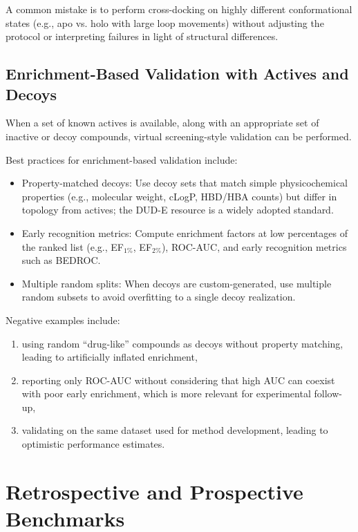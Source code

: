\documentclass[12pt,a4paper]{article}
\begin{document}
A common mistake is to perform cross-docking on highly different conformational states (e.g., apo vs. holo with large loop movements) without adjusting the protocol or interpreting failures in light of structural differences.

\subsection{Enrichment-Based Validation with Actives and Decoys}

When a set of known actives is available, along with an appropriate set of inactive or decoy compounds, virtual screening-style validation can be performed.\cite{CH8_Verdonk2004,CH8_DUD-E2012}

Best practices for enrichment-based validation include:

\begin{itemize}
  \item Property-matched decoys: Use decoy sets that match simple physicochemical properties (e.g., molecular weight, cLogP, HBD/HBA counts) but differ in topology from actives; the DUD-E resource is a widely adopted standard.\cite{CH8_DUD-E2012}
  \item Early recognition metrics: Compute enrichment factors at low percentages of the ranked list (e.g., EF$_{1\%}$, EF$_{2\%}$), ROC-AUC, and early recognition metrics such as BEDROC.\cite{CH8_Truchon2007}
  \item Multiple random splits: When decoys are custom-generated, use multiple random subsets to avoid overfitting to a single decoy realization.
\end{itemize}

Negative examples include:

\begin{enumerate}
  \item using random ``drug-like'' compounds as decoys without property matching, leading to artificially inflated enrichment,
  \item reporting only ROC-AUC without considering that high AUC can coexist with poor early enrichment, which is more relevant for experimental follow-up,\cite{CH8_Truchon2007}
  \item validating on the same dataset used for method development, leading to optimistic performance estimates.
\end{enumerate}

\section{Retrospective and Prospective Benchmarks}
\end{document}
